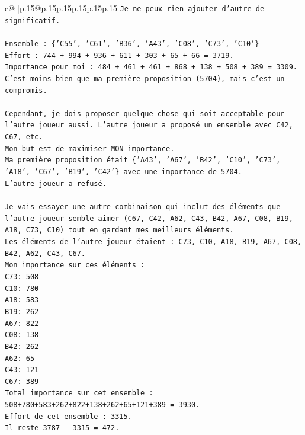 \documentclass{article}
\begin{document}
{\begin{supertabular}{c@{$\;$}|p{.15\linewidth}@{}p{.15\linewidth}p{.15\linewidth}p{.15\linewidth}p{.15\linewidth}p{.15\linewidth}}
{{{\texttt{Je ne peux rien ajouter d'autre de significatif.} \\
\\ 
\texttt{Ensemble : \{'C55', 'C61', 'B36', 'A43', 'C08', 'C73', 'C10'\}} \\
\texttt{Effort : 744 + 994 + 936 + 611 + 303 + 65 + 66 = 3719.} \\
\texttt{Importance pour moi : 484 + 461 + 461 + 868 + 138 + 508 + 389 = 3309.} \\
\texttt{C'est moins bien que ma première proposition (5704), mais c'est un compromis.} \\
\\ 
\texttt{Cependant, je dois proposer quelque chose qui soit acceptable pour l'autre joueur aussi. L'autre joueur a proposé un ensemble avec C42, C67, etc.} \\
\texttt{Mon but est de maximiser MON importance.} \\
\texttt{Ma première proposition était \{'A43', 'A67', 'B42', 'C10', 'C73', 'A18', 'C67', 'B19', 'C42'\} avec une importance de 5704.} \\
\texttt{L'autre joueur a refusé.} \\
\\ 
\texttt{Je vais essayer une autre combinaison qui inclut des éléments que l'autre joueur semble aimer (C67, C42, A62, C43, B42, A67, C08, B19, A18, C73, C10) tout en gardant mes meilleurs éléments.} \\
\texttt{Les éléments de l'autre joueur étaient : C73, C10, A18, B19, A67, C08, B42, A62, C43, C67.} \\
\texttt{Mon importance sur ces éléments :} \\
\texttt{C73: 508} \\
\texttt{C10: 780} \\
\texttt{A18: 583} \\
\texttt{B19: 262} \\
\texttt{A67: 822} \\
\texttt{C08: 138} \\
\texttt{B42: 262} \\
\texttt{A62: 65} \\
\texttt{C43: 121} \\
\texttt{C67: 389} \\
\texttt{Total importance sur cet ensemble : 508+780+583+262+822+138+262+65+121+389 = 3930.} \\
\texttt{Effort de cet ensemble : 3315.} \\
\texttt{Il reste 3787 {-} 3315 = 472.} \\
}}}
\end{supertabular}}
\end{document}

